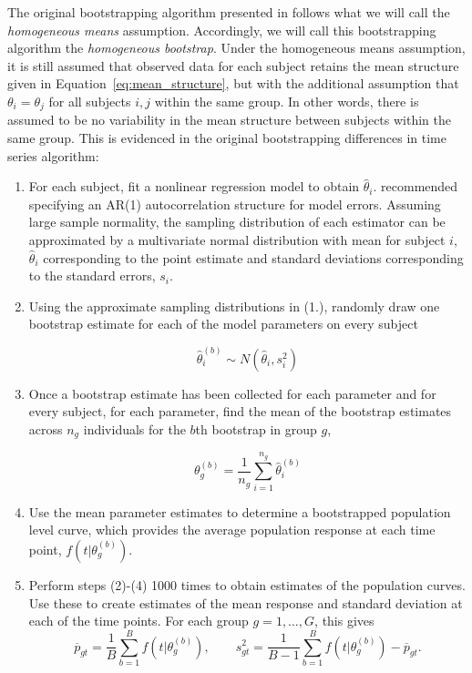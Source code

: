 \documentclass{article}
\begin{document}
The original bootstrapping algorithm presented in \citet{oleson2017detecting} follows what we will call the \textit{homogeneous means} assumption. Accordingly, we will call this bootstrapping algorithm the \textit{homogeneous bootstrap}. Under the homogeneous means assumption, it is still assumed that observed data for each subject retains the mean structure given in Equation~\ref{eq:mean_structure}, but with the additional assumption that $\theta_i = \theta_j$ for all subjects $i, j$ within the same group. In other words, there is assumed to be no variability in the mean structure between subjects within the same group. This is evidenced in the original bootstrapping differences in time series algorithm:


\begin{enumerate}
\vspace{-3mm}
\item For each subject, fit a nonlinear regression model to obtain $\hat{\theta}_i$. \cite{oleson2017detecting} recommended specifying an AR(1) autocorrelation structure for model errors. Assuming large sample normality, the sampling distribution of each estimator can be approximated by a multivariate normal distribution with mean for subject $i$, $\hat{\theta}_i$ corresponding to the point estimate and standard deviations corresponding to the standard errors, $s_i$.

\item Using the approximate sampling distributions in (1.), randomly draw one bootstrap estimate for each of the model parameters on every subject 

\begin{equation}
\hat{\theta}_i^{(b)} \sim N( \hat{\theta}_i, s_i^2)
\end{equation}

\item Once a bootstrap estimate has been collected for each parameter and for every subject, for each parameter, find the mean of the bootstrap estimates across $n_g$ individuals for the $b$th bootstrap in group $g$,

\begin{equation}
\theta_g^{(b)} = \frac{1}{n_g} \sum_{i=1}^{n_g} \hat{\theta}_i^{(b)}
\end{equation}

\item Use the mean parameter estimates to determine a bootstrapped population level curve, which provides the average population response at each time point, $f(t| \theta_g^{(b)})$.

\item Perform steps (2)-(4) 1000 times to obtain estimates of the population curves. Use these to create estimates of the mean response and standard deviation at each of the time points. For each group $g = 1, \dots, G$, this gives
\begin{equation}
\overline{p}_{gt} = \frac1B \sum_{b=1}^B f(t| \theta_g^{(b)}), \qquad s_{gt}^2 = \frac{1}{B-1} \sum_{b=1}^B  f(t| \theta_g^{(b)}) - \overline{p}_{gt}.
\end{equation}
\end{enumerate}
\end{document}

